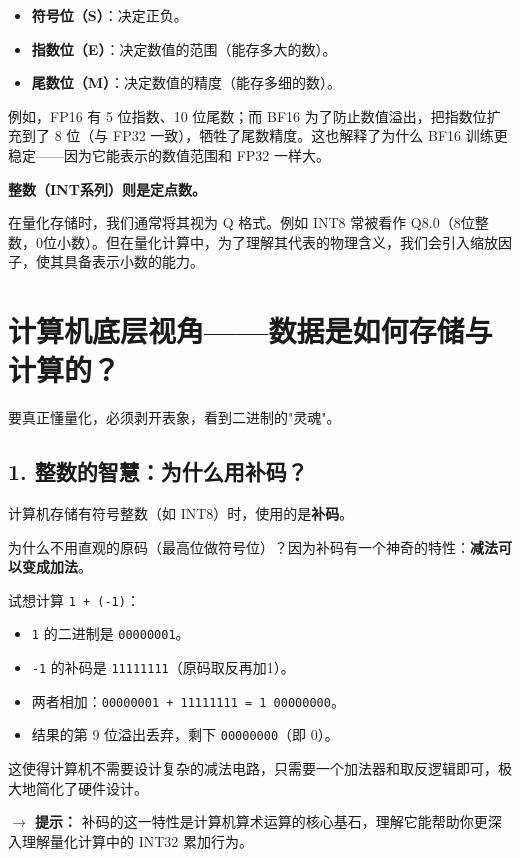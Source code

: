 \documentclass[fontset=fandol,11pt,a4paper]{ctexart}
\newcommand{\keyword}[1]{\textbf{\color{Primary}#1}}
\newcommand{\concept}[1]{\textbf{\color{Accent}#1}}
\newcommand{\codeinline}[1]{\texttt{\color{Primary!80}#1}}
\begin{document}
\begin{itemize}
  \item \keyword{符号位（S）}：决定正负。
  \item \keyword{指数位（E）}：决定数值的范围（能存多大的数）。
  \item \keyword{尾数位（M）}：决定数值的精度（能存多细的数）。
\end{itemize}

例如，FP16 有 5 位指数、10 位尾数；而 BF16 为了防止数值溢出，把指数位扩充到了 8 位（与 FP32 一致），牺牲了尾数精度。这也解释了为什么 BF16 训练更稳定——因为它能表示的数值范围和 FP32 一样大。

\concept{整数（INT系列）则是定点数。}

在量化存储时，我们通常将其视为 Q 格式。例如 INT8 常被看作 Q8.0（8位整数，0位小数）。但在量化计算中，为了理解其代表的物理含义，我们会引入缩放因子，使其具备表示小数的能力。

\section{计算机底层视角——数据是如何存储与计算的？}

要真正懂量化，必须剥开表象，看到二进制的"灵魂"。

\subsection{1. 整数的智慧：为什么用补码？}

计算机存储有符号整数（如 INT8）时，使用的是\concept{补码}。

为什么不用直观的原码（最高位做符号位）？因为补码有一个神奇的特性：\keyword{减法可以变成加法}。

试想计算 \codeinline{1 + (-1)}：

\begin{itemize}
  \item \codeinline{1} 的二进制是 \codeinline{00000001}。
  \item \codeinline{-1} 的补码是 \codeinline{11111111}（原码取反再加1）。
  \item 两者相加：\codeinline{00000001 + 11111111 = 1 00000000}。
  \item 结果的第 9 位溢出丢弃，剩下 \codeinline{00000000}（即 0）。
\end{itemize}

这使得计算机不需要设计复杂的减法电路，只需要一个加法器和取反逻辑即可，极大地简化了硬件设计。

\begin{tipbox}
\textbf{$\rightarrow$ 提示：} 补码的这一特性是计算机算术运算的核心基石，理解它能帮助你更深入理解量化计算中的 INT32 累加行为。
\end{tipbox}
\end{document}
